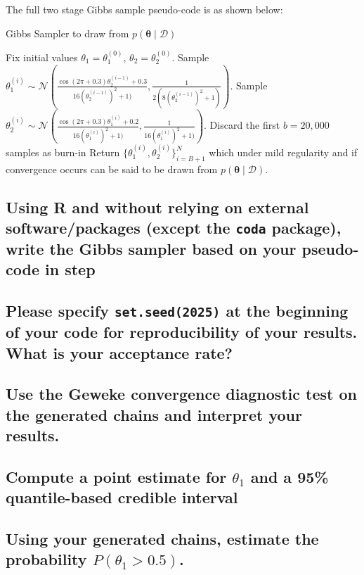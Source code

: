 \documentclass[12pt]{article}
\begin{document}
The full two stage Gibbs sample pseudo-code is as shown below:
\begin{algorithm}
Gibbs Sampler to draw from \( p(\boldsymbol{\theta} \mid \mathcal{D}) \)
\begin{algorithmic}[1]

\State Fix initial values \( \theta_1 = \theta_1^{(0)} \), \( \theta_2 = \theta_2^{(0)} \).
    \State Sample \( \theta_1^{(i)} \sim \mathcal{N}\left(\frac{\cos(2\pi + 0.3)\theta_2^{(i-1)} + 0.3}{16(\theta_2^{(i-1)})^2 + 1)}, \frac{1}{2(8(\theta_2^{(i-1)})^2 + 1)}\right) \).
    \State Sample \( \theta_2^{(i)} \sim \mathcal{N}\left(\frac{\cos(2\pi + 0.3)\theta_1^{(i)} + 0.2}{16(\theta_1^{(i)})^2 + 1)}, \frac{1}{16(\theta_1^{(i)})^2 + 1)}\right) \).
\EndFor
\State Discard the first \( b = 20,000 \) samples as burn-in
\State Return \( \{\theta_1^{(i)}, \theta_2^{(i)}\}_{i=B+1}^{N} \) which under mild regularity and if convergence occurs can be said to be drawn from \( p(\boldsymbol{\theta} \mid \mathcal{D}) \).
\end{algorithmic}
\end{algorithm}
\subsection{Using R and without relying on external software/packages (except the \texttt{coda} package), write the Gibbs sampler based on your pseudo-code in step }

\subsection{Please specify \texttt{set.seed(2025)} at the beginning of your code for reproducibility of your results. What is your acceptance rate?}

\subsection{Use the Geweke convergence diagnostic test on the generated chains and interpret your results.}

\subsection{Compute a point estimate for $\theta_1$ and a 95\% quantile-based credible interval}

\subsection{Using your generated chains, estimate the probability $P(\theta_1 > 0.5)$.}
\end{document}
